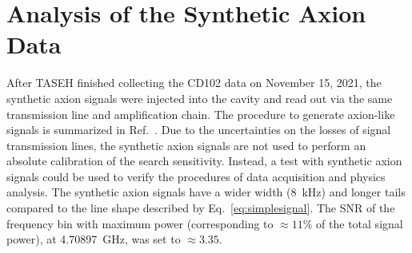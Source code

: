 \section{Analysis of the Synthetic Axion Data}\label{sec:faxion}
After TASEH finished collecting the CD102 data on November 15, 2021, 
the synthetic axion signals were injected into the cavity and read out via the 
same transmission line and amplification chain. The procedure 
to generate axion-like signals is summarized in 
Ref.~\cite{TASEHInstrumentation}. 
Due to the uncertainties on the losses of signal transmission
 lines, the synthetic axion signals are not used to perform an absolute 
calibration of the search sensitivity. Instead, 
a test with synthetic axion signals could be used to verify the procedures of 
data acquisition and physics analysis. The synthetic axion signals 
have a wider width (8~kHz) and longer tails compared to the line shape 
described by Eq.~\eqref{eq:simplesignal}. The 
SNR of the frequency bin with maximum power 
(corresponding to $\approx 11\%$ of the total signal power),  
 at 4.70897~GHz, was set to $\approx 3.35$. 

